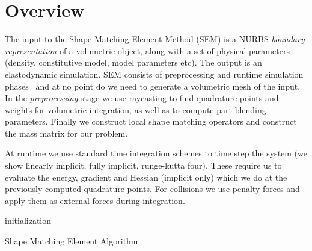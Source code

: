 
\section{Overview}
The input to the Shape Matching Element Method (SEM)  is a NURBS \emph{boundary representation} of a volumetric object, along with a set of physical parameters 
(density, constitutive model, model parameters etc). The output is an elastodynamic simulation. 
SEM consists of preprocessing and runtime simulation phases~ and at no point do we need to generate a volumetric mesh of the input. 
In the \emph{preprocessing} stage we use raycasting to find quadrature points and weights for volumetric integration, as well as to compute part blending parameters. 
Finally we construct local shape matching operators and construct the mass matrix for our problem. 

At runtime we use standard time integration schemes to time step the system (we show linearly implicit, fully implicit, runge-kutta four). 
These require us to evaluate the energy, gradient and Hessian (implicit only) which we do at the previously computed quadrature points. 
For collisions we use penalty forces and apply them as external forces during integration.

\begin{algorithm}[h]
    \label{alg:sem}
    \SetAlgoLined
     initialization\;
     \caption{Shape Matching Element Algorithm}
    \end{algorithm}

